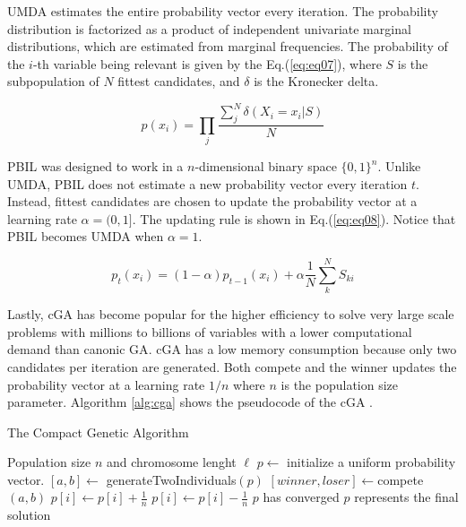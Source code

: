 UMDA estimates the entire probability vector every iteration.  The probability distribution is factorized as a product of independent univariate marginal distributions, which are estimated from marginal frequencies.  The probability of the \(i\)-th variable being relevant is given by the Eq.(\ref{eq:eq07}), where \(S\) is the subpopulation of \(N\) fittest candidates, and \(\delta\) is the Kronecker delta.

\begin{equation}
	p(x_i)= \prod_{j} \frac {\sum_{j}^{N} \delta(X_i=x_i|S)} {N}
\label{eq:eq07}
\end{equation}

PBIL was designed to work in a \(n\)-dimensional binary space \(\{0,1\}^n\).  Unlike UMDA, PBIL does not estimate a new probability vector every iteration \(t\). Instead, fittest candidates are chosen to update the probability vector at a learning rate \(\alpha=(0,1]\). The updating rule is shown in Eq.(\ref{eq:eq08}). Notice that PBIL becomes UMDA when \(\alpha=1\). 

\begin{equation}
	p_{t}(x_i)= (1-\alpha)p_{t-1}(x_i)+\alpha \frac{1}{N} \sum_{k}^{N} S_{ki} 
\label{eq:eq08}
\end{equation}


Lastly, cGA has become popular for the higher efficiency to solve very large scale problems with millions to billions of variables with a lower computational demand than canonic GA\cite{goldberg07}.  cGA has a low memory consumption because only two candidates per iteration are generated.  Both compete and the winner updates the probability vector at a learning rate \(1/n\) where \(n\) is the population size parameter. 
Algorithm \ref{alg:cga} shows the pseudocode of the cGA .

\begin{algorithm}[ht]
	\caption{\textsf{The Compact Genetic Algorithm}} 
	\begin{algorithmic}
		\REQUIRE Population size $n$ and chromosome lenght $\ell$
		\STATE $p \gets$ initialize a uniform probability vector.
		\REPEAT
			\STATE $[a,b] \gets$ generateTwoIndividuals$(p)$
			\STATE $[winner, loser] \gets $compete$(a,b)$
						\STATE $p[i] \gets p[i] + \frac{1}{n}$
					\ELSE
						\STATE $p[i] \gets p[i] - \frac{1}{n}$
					\ENDIF
				\ENDIF
			\ENDFOR
	\UNTIL $p$ has converged
	\ENSURE $p$ represents the final solution
	\end{algorithmic}
	\label{alg:cga}
\end{algorithm}
